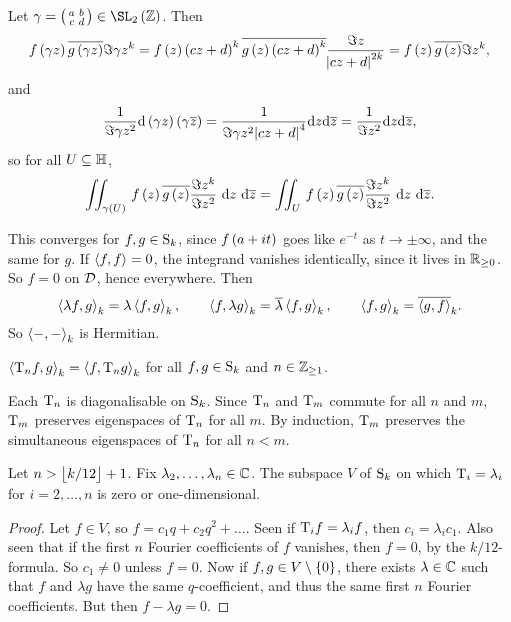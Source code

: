 \pagebreak

Let $ \gamma = \twobytwosmall{a}{b}{c}{d} \in \SL_2\br{\ZZ} $. Then
$$ f\br{\gamma z}\overline{g\br{\gamma z}}\Im \gamma z^k = f\br{z}\br{cz + d}^k\overline{g\br{z}\br{cz + d}^k}\dfrac{\Im z}{\abs{cz + d}^{2k}} = f\br{z}\overline{g\br{z}}\Im z^k, $$
and
$$ \dfrac{1}{\Im \gamma z^2}\d\br{\gamma z}\br{\gamma \overline{z}} = \dfrac{1}{\Im \gamma z^2\abs{cz + d}^4}\d z\d\overline{z} = \dfrac{1}{\Im z^2}\d z\d\overline{z}, $$
so for all $ U \subseteq \HH $,
$$ \iintd{\gamma\br{U}}{f\br{z}\overline{g\br{z}}\dfrac{\Im z^k}{\Im z^2}}{z}{\overline{z}} = \iintd{U}{f\br{z}\overline{g\br{z}}\dfrac{\Im z^k}{\Im z^2}}{z}{\overline{z}}. $$

\begin{note*}
This converges for $ f, g \in \S_k $, since $ f\br{a + it} $ goes like $ e^{-t} $ as $ t \to \pm\infty $, and the same for $ g $. If $ \abr{f, f} = 0 $, the integrand vanishes identically, since it lives in $ \RR_{\ge 0} $. So $ f = 0 $ on $ \DDD $, hence everywhere. Then
$$ \abr{\lambda f, g}_k = \lambda\abr{f, g}_k, \qquad \abr{f, \lambda g}_k = \overline{\lambda}\abr{f, g}_k, \qquad \abr{f, g}_k = \overline{\abr{g, f}}_k. $$
So $ \abr{-, -}_k $ is Hermitian.
\end{note*}

\begin{theorem}
\label{thm:innerproduct}
$ \abr{\T_nf, g}_k = \abr{f, \T_ng}_k $ for all $ f, g \in \S_k $ and $ n \in \ZZ_{\ge 1} $.
\end{theorem}

\begin{corollary}
Each $ \T_n $ is diagonalisable on $ \S_k $. Since $ \T_n $ and $ \T_m $ commute for all $ n $ and $ m $, $ \T_m $ preserves eigenspaces of $ \T_n $ for all $ m $. By induction, $ \T_m $ preserves the simultaneous eigenspaces of $ \T_n $ for all $ n < m $.
\end{corollary}

\begin{proposition}
Let $ n > \fbr{k / 12} + 1 $. Fix $ \lambda_2, \dots, \lambda_n \in \CC $. The subspace $ V $ of $ \S_k $ on which $ \T_i = \lambda_i $ for $ i = 2, \dots, n $ is zero or one-dimensional.
\end{proposition}

\begin{proof}
Let $ f \in V $, so $ f = c_1q + c_2q^2 + \dots $. Seen if $ \T_if = \lambda_if $, then $ c_i = \lambda_ic_1 $. Also seen that if the first $ n $ Fourier coefficients of $ f $ vanishes, then $ f = 0 $, by the $ k / 12 $-formula. So $ c_1 \ne 0 $ unless $ f = 0 $. Now if $ f, g \in V \setminus \cbr{0} $, there exists $ \lambda \in \CC $ such that $ f $ and $ \lambda g $ have the same $ q $-coefficient, and thus the same first $ n $ Fourier coefficients. But then $ f - \lambda g = 0 $.
\end{proof}

